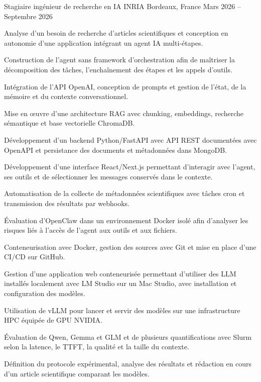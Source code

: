 
\begin{cventries}
  \cventry
    {Stagiaire ingénieur de recherche en IA}
    {INRIA}
    {Bordeaux, France}
    {Mars 2026 -- Septembre 2026}
    {
      \begin{cvitems}
        \item {Analyse d’un besoin de recherche d’articles scientifiques et conception en autonomie d’une application intégrant un agent IA multi-étapes.}
        \item {Construction de l’agent sans framework d’orchestration afin de maîtriser la décomposition des tâches, l’enchaînement des étapes et les appels d’outils.}
        \item {Intégration de l’API OpenAI, conception de prompts et gestion de l’état, de la mémoire et du contexte conversationnel.}
        \item {Mise en œuvre d’une architecture RAG avec chunking, embeddings, recherche sémantique et base vectorielle ChromaDB.}
        \item {Développement d’un backend Python/FastAPI avec API REST documentées avec OpenAPI et persistance des documents et métadonnées dans MongoDB.}
        \item {Développement d’une interface React/Next.js permettant d’interagir avec l’agent, ses outils et de sélectionner les messages conservés dans le contexte.}
        \item {Automatisation de la collecte de métadonnées scientifiques avec tâches cron et transmission des résultats par webhooks.}
        \item {Évaluation d’OpenClaw dans un environnement Docker isolé afin d’analyser les risques liés à l’accès de l’agent aux outils et aux fichiers.}
        \item {Conteneurisation avec Docker, gestion des sources avec Git et mise en place d’une CI/CD sur GitHub.}
        \item {Gestion d’une application web conteneurisée permettant d’utiliser des LLM installés localement avec LM Studio sur un Mac Studio, avec installation et configuration des modèles.}
        \item {Utilisation de vLLM pour lancer et servir des modèles sur une infrastructure HPC équipée de GPU NVIDIA.}
        \item {Évaluation de Qwen, Gemma et GLM et de plusieurs quantifications avec Slurm selon la latence, le TTFT, la qualité et la taille du contexte.}
        \item {Définition du protocole expérimental, analyse des résultats et rédaction en cours d’un article scientifique comparant les modèles.}
      \end{cvitems}
    }


\end{cventries}
